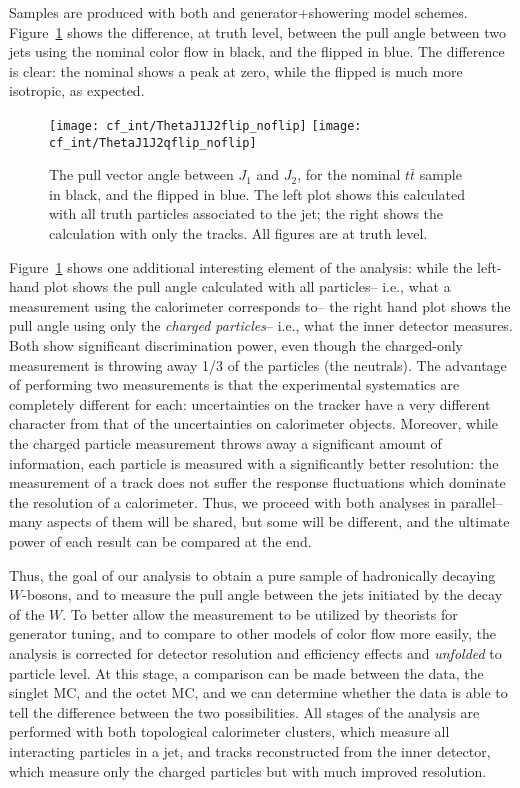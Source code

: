 Samples are produced with both \PowPythia and \PowHerwig generator+showering model schemes. Figure~\ref{fig:color:motivation:validation} shows the difference, at truth level, between the pull angle between two jets using the nominal color flow in black, and the flipped in blue. The difference is clear: the nominal shows a peak at zero, while the flipped is much more isotropic, as expected.

\begin{figure}
\begin{center}
\texttt{[image: cf\_int/ThetaJ1J2flip\_noflip]}
\texttt{[image: cf\_int/ThetaJ1J2qflip\_noflip]}
\caption{The pull vector angle between $J_1$ and $J_2$, for the nominal $t\bar{t}$ sample in black, and the flipped in blue. The left plot shows this calculated with all truth particles associated to the jet; the right shows the calculation with only the tracks. All figures are at truth level.}
\label{fig:color:motivation:validation}
\end{center}
\end{figure}

Figure~\ref{fig:color:motivation:validation} shows one additional interesting element of the analysis: while the left-hand plot shows the pull angle calculated with all particles-- i.e., what a measurement using the calorimeter corresponds to-- the right hand plot shows the pull angle using only the \textit{charged particles}-- i.e., what the inner detector measures. Both show significant discrimination power, even though the charged-only measurement is throwing away 1/3 of the particles (the neutrals). The advantage of performing two measurements is that the experimental systematics are completely different for each: uncertainties on the tracker have a very different character from that of the uncertainties on calorimeter objects. Moreover, while the charged particle measurement throws away a significant amount of information, each particle is measured with a significantly better resolution: the \pt measurement of a track does not suffer the response fluctuations which dominate the resolution of a calorimeter. Thus, we proceed with both analyses in parallel-- many aspects of them will be shared, but some will be different, and the ultimate power of each result can be compared at the end.


Thus, the goal of our analysis to obtain a pure sample of hadronically decaying $W$-bosons, and to measure the pull angle between the jets initiated by the decay of the $W$. To better allow the measurement to be utilized by theorists for generator tuning, and to compare to other models of color flow more easily, the analysis is corrected for detector resolution and efficiency effects and \textit{unfolded} to particle level. At this stage, a comparison can be made between the data, the singlet MC, and the octet MC, and we can determine whether the data is able to tell the difference between the two possibilities. All stages of the analysis are performed with both topological calorimeter clusters, which measure all interacting particles in a jet, and tracks reconstructed from the inner detector, which measure only the charged particles but with much improved resolution.

